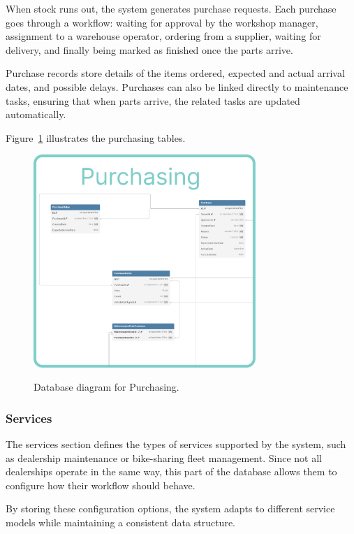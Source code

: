 When stock runs out, the system generates purchase requests. Each purchase goes through a workflow: waiting for approval by the workshop manager, assignment to a warehouse operator, ordering from a supplier, waiting for delivery, and finally being marked as finished once the parts arrive.

Purchase records store details of the items ordered, expected and actual arrival dates, and possible delays. Purchases can also be linked directly to maintenance tasks, ensuring that when parts arrive, the related tasks are updated automatically.

Figure~\ref{fig:dbPurchasing} illustrates the purchasing tables.

\begin{figure}[h]
  \caption{Database diagram for Purchasing.}
  \centering
  \includegraphics[width=0.75\textwidth]{figs/dbDiagrams/Purchasing}
  \label{fig:dbPurchasing}
\end{figure}


\subsubsection{Services} 

The services section defines the types of services supported by the system, such as dealership maintenance or bike-sharing fleet management. Since not all dealerships operate in the same way, this part of the database allows them to configure how their workflow should behave.

By storing these configuration options, the system adapts to different service models while maintaining a consistent data structure.

